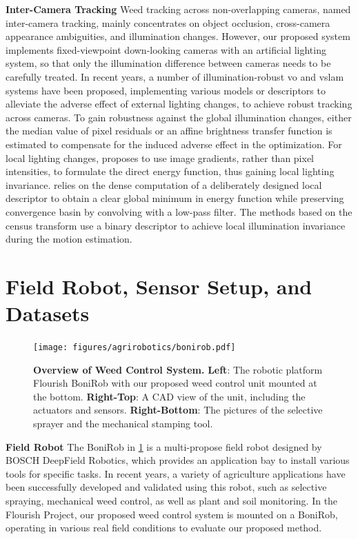 \noindent \textbf{Inter-Camera Tracking} 
Weed tracking across non-overlapping cameras, named inter-camera tracking, mainly concentrates on object occlusion, cross-camera appearance ambiguities, and illumination changes. 
However, our proposed system implements fixed-viewpoint down-looking cameras with an artificial lighting system, so that only the illumination difference between cameras needs to be carefully treated. 
In recent years, a number of illumination-robust \acrshort{vo} and \acrshort{vslam} systems have been proposed, implementing various models or descriptors to alleviate the adverse effect of external lighting changes, to achieve robust tracking across cameras. 
To gain robustness against the global illumination changes, either the median value of pixel residuals \cite{meilland2011real} \cite{gonccalves2011real} \cite{bloesch2015robust} \cite{greene2016multi} or an affine brightness transfer function \cite{klose2013efficient} \cite{engel2015large} is estimated to compensate for the induced adverse effect in the optimization. 
For local lighting changes, \cite{dai2017bundlefusion} proposes to use image gradients, rather than pixel intensities, to formulate the direct energy function, thus gaining local lighting invariance. \cite{crivellaro2014robust} relies on the dense computation of a deliberately designed local descriptor to obtain a clear global minimum in energy function while preserving convergence basin by convolving with a low-pass filter. 
The methods based on the census transform \cite{alismail2016direct} use a binary descriptor to achieve local illumination invariance during the motion estimation. 

\section{Field Robot, Sensor Setup, and Datasets}

\begin{figure}[t]
	\centering
	\texttt{[image: figures/agrirobotics/bonirob.pdf]}
	\caption[Overview of Weed Control System]{\textbf{Overview of Weed Control System.} \textbf{Left}: The robotic platform Flourish BoniRob with our proposed weed control unit mounted at the bottom. \textbf{Right-Top}: A CAD view of the unit, including the actuators and sensors. \textbf{Right-Bottom}: The pictures of the selective sprayer and the mechanical stamping tool.
	\label{fig:argirobotics_bonirob}}
\end{figure}

\noindent \textbf{Field Robot} 
The BoniRob in \ref{fig:argirobotics_bonirob} is a multi-propose field robot designed by BOSCH DeepField Robotics, which provides an application bay to install various tools for specific tasks. 
In recent years, a variety of agriculture applications have been successfully developed and validated using this robot, such as selective spraying, mechanical weed control, as well as plant and soil monitoring.
In the Flourish Project, our proposed weed control system is mounted on a BoniRob, operating in various real field conditions to evaluate our proposed method.

